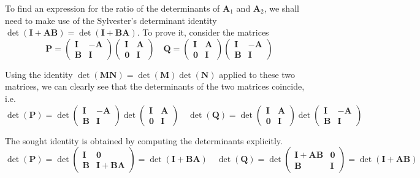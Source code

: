 To find an expression for the ratio of the determinants of $\bm A_1$ and $\bm A_2$, we shall need to make use of the Sylvester's determinant identity $\det(\bm I + \bm A \bm B ) = \det (\bm I + \bm B \bm A )$.
To prove it, consider the matrices
\begin{equation}
\bm P =
\begin{pmatrix}
\bm I & - \bm A \\
\bm B & \bm I 
\end{pmatrix}
\begin{pmatrix}
\bm I &  \bm A \\
\bm 0 & \bm I 
\end{pmatrix}
\quad
\bm Q =
\begin{pmatrix}
\bm I &  \bm A \\
\bm 0 & \bm I 
\end{pmatrix}
\begin{pmatrix}
\bm I &  -\bm A \\
\bm B & \bm I 
\end{pmatrix}
\end{equation}

Using the identity $\det ( \bm M \bm N ) = \det ( \bm M ) \det ( \bm N )$ applied to these two matrices, we can clearly see that the determinants of the two matrices coincide, i.e.
\begin{equation}
\det ( \bm P) = \det
\begin{pmatrix}
\bm I & -\bm A \\
\bm B & \bm I
\end{pmatrix}
\det
\begin{pmatrix}
\bm I & \bm A \\
\bm 0 & \bm I
\end{pmatrix}
\quad
\det (\bm Q) = \det
\begin{pmatrix}
\bm I & \bm A \\
\bm 0 & \bm I
\end{pmatrix}
\det
\begin{pmatrix}
\bm I & -\bm A \\
\bm B & \bm I
\end{pmatrix}
\end{equation}

The sought identity is obtained by computing the determinants explicitly.
\begin{equation}
\det ( \bm P ) = \det
\begin{pmatrix}
\bm I & \bm 0 \\
\bm B & \bm I + \bm B \bm A 
\end{pmatrix}
= \det (\bm I + \bm B \bm A )
\quad
\det ( \bm Q ) = \det
\begin{pmatrix}
\bm I + \bm A \bm B & \bm 0 \\
\bm B & \bm I
\end{pmatrix}
= \det ( \bm I + \bm A \bm B )
\end{equation}

